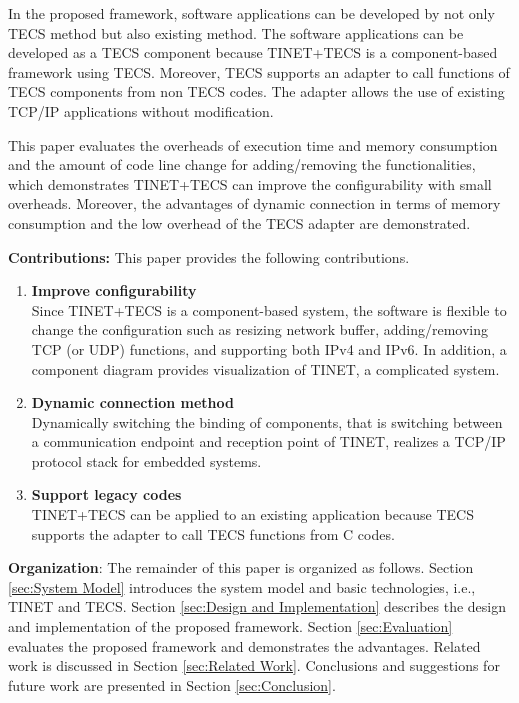 \documentclass[conference]{IEEEtran/IEEEtran}
\begin{document}
In the proposed framework, software applications can be developed by not only TECS method but also existing method.
The software applications can be developed as a TECS component because TINET+TECS is a component-based framework using TECS.
Moreover, TECS supports an adapter to call functions of TECS components from non TECS codes.
The adapter allows the use of existing TCP/IP applications without modification.

This paper evaluates the overheads of execution time and memory consumption and the amount of code line change for adding/removing the functionalities, which demonstrates TINET+TECS can improve the configurability with small overheads.
Moreover, the advantages of dynamic connection in terms of memory consumption and the low overhead of the TECS adapter are demonstrated.

{\bf Contributions:} This paper provides the following contributions.

\begin{enumerate}

    \item {\bf Improve configurability}\mbox{}\\
        Since TINET+TECS is a component-based system, the software is flexible to change the configuration such as resizing network buffer, adding/removing TCP (or UDP) functions, and supporting both IPv4 and IPv6.
        In addition, a component diagram provides visualization of TINET, a complicated system.

    \item {\bf Dynamic connection method}\mbox{}\\
        Dynamically switching the binding of components, that is switching between a communication endpoint and reception point of TINET, realizes a TCP/IP protocol stack for embedded systems.
        
    \item {\bf Support legacy codes}\mbox{}\\
        TINET+TECS can be applied to an existing application because TECS supports the adapter to call TECS functions from C codes. 

\end{enumerate}

{\bf Organization}: The remainder of this paper is organized as follows.
Section \ref{sec:System Model} introduces the system model and basic technologies, i.e., TINET and TECS.
Section \ref{sec:Design and Implementation} describes the design and implementation of the proposed framework.
Section \ref{sec:Evaluation} evaluates the proposed framework and demonstrates the advantages.
Related work is discussed in Section \ref{sec:Related Work}.
Conclusions and suggestions for future work are presented in Section \ref{sec:Conclusion}.
\end{document}
